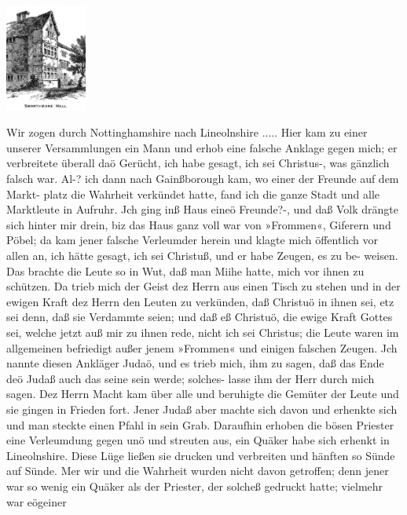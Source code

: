 \begin{floatingfigure}[3]{4cm}
\includegraphics[width=0.20\textwidth]{./pics/swarthmore_hall.png}
\label{bild:swarthmoor} 
\end{floatingfigure}



Wir zogen durch Nottinghamshire nach Lineolnshire .....
Hier kam zu einer unserer Versammlungen ein Mann und erhob eine
falsche Anklage gegen mich; er verbreitete überall daö Gerücht, ich
habe gesagt, ich sei Christus-, was gänzlich falsch war. Al-? ich dann
nach Gainßborough kam, wo einer der Freunde auf dem Markt-
platz die Wahrheit verkündet hatte, fand ich die ganze Stadt und
alle Marktleute in Aufruhr. Jch ging inß Haus eineö Freunde?-,
und daß Volk drängte sich hinter mir drein, biz das Haus ganz
voll war von »Frommen«, Giferern und Pöbel; da kam jener
falsche Verleumder herein und klagte mich öffentlich vor allen an,
ich hätte gesagt, ich sei Christuß, und er habe Zeugen, es zu be-
weisen. Das brachte die Leute so in Wut, daß man Miihe hatte,
mich vor ihnen zu schützen. Da trieb mich der Geist dez Herrn
aus einen Tisch zu stehen und in der ewigen Kraft dez Herrn
den Leuten zu verkünden, daß Christuö in ihnen sei, etz sei denn,
daß sie Verdammte seien; und daß eß Christuö, die ewige Kraft
Gottes sei, welche jetzt auß mir zu ihnen rede, nicht ich sei Christus;
die Leute waren im allgemeinen befriedigt außer jenem »Frommen«
und einigen falschen Zeugen. Jch nannte diesen Ankläger Judaö,
und es trieb mich, ihm zu sagen, daß das Ende deö Judaß auch
das seine sein werde; solches- lasse ihm der Herr durch mich sagen.
Dez Herrn Macht kam über alle und beruhigte die Gemüter der
Leute und sie gingen in Frieden fort. Jener Judaß aber machte
sich davon und erhenkte sich und man steckte einen Pfahl in sein
Grab. Daraufhin erhoben die bösen Priester eine Verleumdung
gegen unö und streuten aus, ein Quäker habe sich erhenkt in
Lineolnshire. Diese Lüge ließen sie drucken und verbreiten und
hänften so Sünde auf Sünde. Mer wir und die Wahrheit wurden
nicht davon getroffen; denn jener war so wenig ein Quäker als
der Priester, der solcheß gedruckt hatte; vielmehr war eögeiner


